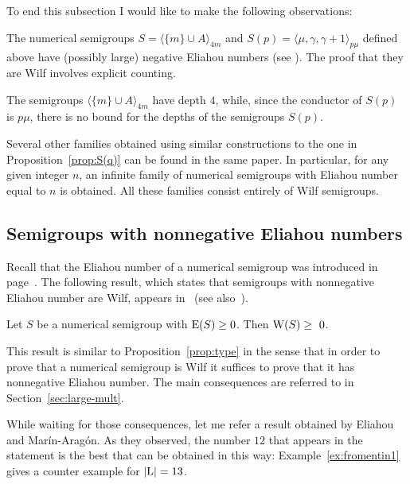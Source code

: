 To end this subsection I would like to make the following observations:
\begin{remark}\label{rem:non-eliahou}
	The numerical semigroups $S=\langle \{m\}\cup A\rangle_{4m}$ and $S(p)=\langle \mu,\gamma,\gamma+1\rangle_{p\mu}$ defined above have (possibly large) negative Eliahou numbers (see \cite{Delgado2018MZ-question,EliahouFromentin2018SF-misses}). The proof that they are Wilf involves explicit counting.
\end{remark}
\begin{remark}
	The semigroups $\langle \{m\}\cup A\rangle_{4m}$ have depth $4$, while, since the conductor of $S(p)$ is $p\mu$,  there is no bound for the depths of the  semigroups $S(p)$.   
\end{remark}
\begin{remark}
	Several other families obtained using similar constructions to the one in Proposition~\ref{prop:S(q)} can be found in the same paper. In particular, for any given integer $n$,  an infinite family of numerical semigroups with Eliahou number equal to $n$ is obtained.
	All these families consist entirely of Wilf semigroups.
\end{remark}
   
\subsection{Semigroups with nonnegative Eliahou numbers}

Recall that the Eliahou number of a numerical semigroup was introduced in page~\pageref{eq:eliahou-number}. The following result, which states that semigroups with nonnegative Eliahou number are Wilf, appears in~\cite[Prop.~3.11]{Eliahou2018JEMS-Wilfs} (see also~\cite[Cor.~2.3]{EliahouFromentin2018SF-misses}).

\begin{proposition}\label{prop:eliahou-implies-wilf}
	Let $S$ be a numerical semigroup with $\operatorname{E}(S)\ge 0$. Then $\operatorname{W}(S)\ge~0$.
\end{proposition}

This result is similar to Proposition~\ref{prop:type} in the sense that in order to prove that a numerical semigroup is Wilf it suffices to prove that it has nonnegative Eliahou number. The main consequences are referred to in Section~\ref{sec:large-mult}.

While waiting for those consequences, let me refer a result obtained by Eliahou and Marín-Aragón. As they observed, the number $12$ that appears in the statement is the best that can be obtained in this way: Example~\ref{ex:fromentin1} gives a counter example for $\left|\operatorname{L}\right|= 13$.

